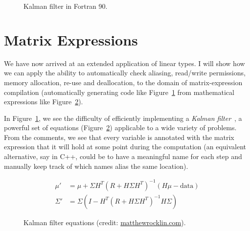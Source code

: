 \begin{landscape}
    \begin{figure}[p]
    \centering
    \inputminted[fontsize=\footnotesize]{fortran}{kalman.f90}
    \caption{Kalman filter in Fortran 90.}\label{fig:fortran_kalman}
    \end{figure}
\end{landscape}

\section{Matrix Expressions}\label{sec:matrix_exps}

We have now arrived at an extended application of linear types. I will show how
we can apply the ability to automatically check aliasing, read/write
permissions, memory allocation, re-use and deallocation, to the domain of
matrix-expression compilation (automatically generating code like
Figure~\ref{fig:fortran_kalman} from mathematical expressions like
Figure~\ref{fig:maths_kalman}).

In Figure~\ref{fig:fortran_kalman}, we see the difficulty of efficiently
implementing a \emph{Kalman filter}~\cite{kalman}, a powerful set of equations
(Figure~\ref{fig:maths_kalman}) applicable to a wide variety of problems. From
the comments, we see that every variable is annotated with the matrix
expression that it will hold at some point during the computation (an
equivalent alternative, say in C++, could be to have a meaningful name for each
step and manually keep track of which names alias the same location).

\begin{figure}[tp]
    \begin{align*}
        \mu' &= \mu + \Sigma H^T (R + H \Sigma H^T)^{-1} (H \mu - \textrm{data})\\
        \Sigma' &= \Sigma ( I - H^T (R + H \Sigma H^T)^{-1} H \Sigma )
    \end{align*}
    \caption{Kalman filter equations (credit:
    \href{http://matthewrocklin.com/blog/work/2012/11/24/Kalman-Filter}{matthewrocklin.com}).}\label{fig:maths_kalman}
\end{figure}

